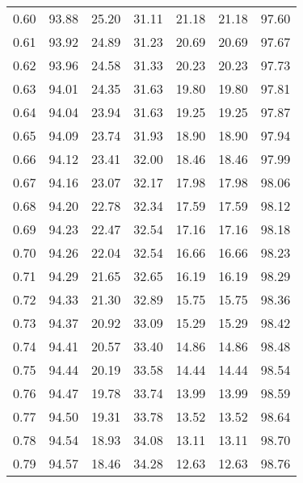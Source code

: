 \begin{tabular}{|c|c|c|c|c|c|c|}
      0.60 &     93.88 &     25.20 &      31.11 &   21.18 &      21.18 &         97.60 \\
      0.61 &     93.92 &     24.89 &      31.23 &   20.69 &      20.69 &         97.67 \\
      0.62 &     93.96 &     24.58 &      31.33 &   20.23 &      20.23 &         97.73 \\
      0.63 &     94.01 &     24.35 &      31.63 &   19.80 &      19.80 &         97.81 \\
      0.64 &     94.04 &     23.94 &      31.63 &   19.25 &      19.25 &         97.87 \\
      0.65 &     94.09 &     23.74 &      31.93 &   18.90 &      18.90 &         97.94 \\
      0.66 &     94.12 &     23.41 &      32.00 &   18.46 &      18.46 &         97.99 \\
      0.67 &     94.16 &     23.07 &      32.17 &   17.98 &      17.98 &         98.06 \\
      0.68 &     94.20 &     22.78 &      32.34 &   17.59 &      17.59 &         98.12 \\
      0.69 &     94.23 &     22.47 &      32.54 &   17.16 &      17.16 &         98.18 \\
      0.70 &     94.26 &     22.04 &      32.54 &   16.66 &      16.66 &         98.23 \\
      0.71 &     94.29 &     21.65 &      32.65 &   16.19 &      16.19 &         98.29 \\
      0.72 &     94.33 &     21.30 &      32.89 &   15.75 &      15.75 &         98.36 \\
      0.73 &     94.37 &     20.92 &      33.09 &   15.29 &      15.29 &         98.42 \\
      0.74 &     94.41 &     20.57 &      33.40 &   14.86 &      14.86 &         98.48 \\
      0.75 &     94.44 &     20.19 &      33.58 &   14.44 &      14.44 &         98.54 \\
      0.76 &     94.47 &     19.78 &      33.74 &   13.99 &      13.99 &         98.59 \\
      0.77 &     94.50 &     19.31 &      33.78 &   13.52 &      13.52 &         98.64 \\
      0.78 &     94.54 &     18.93 &      34.08 &   13.11 &      13.11 &         98.70 \\
      0.79 &     94.57 &     18.46 &      34.28 &   12.63 &      12.63 &         98.76 \\

\end{tabular}
